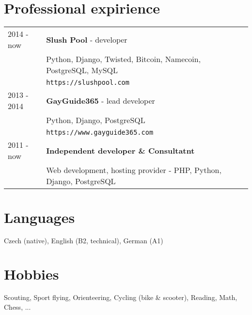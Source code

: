 \documentclass[12pt,a4paper]{article}
\begin{document}
\section*{Professional expirience}
\begin{tabular}{@{}p{2cm}l}
2014 - now & {\bf Slush Pool} - developer\\
 & Python, Django, Twisted, Bitcoin, Namecoin, PostgreSQL, MySQL\\
 & \texttt{https://slushpool.com}\\
2013 - 2014 & {\bf GayGuide365} - lead developer\\
 & Python, Django, PostgreSQL\\
 & \texttt{https://www.gayguide365.com}\\
2011 - now & {\bf Independent developer \& Consultatnt}\\
 & Web development, hosting provider - PHP, Python, Django, PostgreSQL\\
\end{tabular}

\section*{Languages}
Czech (native), English (B2, technical), German (A1)\\

\section*{Hobbies}
Scouting, Sport flying, Orienteering, Cycling (bike \& scooter), Reading, Math, Chess, ...
\\
\end{document}
